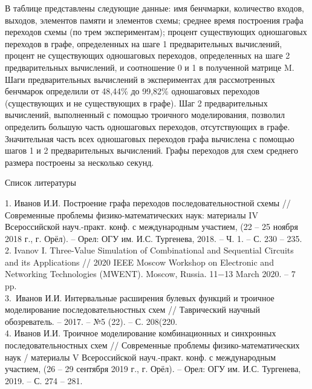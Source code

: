 \documentclass[17pt]{extarticle}
\begin{document}
В таблице представлены следующие данные: имя бенчмарки, количество входов, выходов, элементов памяти и элементов схемы; среднее время построения графа переходов схемы (по трем экспериментам); процент существующих одношаговых переходов в графе, определенных на шаге 1 предварительных вычислений, процент не существующих одношаговых переходов, определенных на шаге 2 предварительных вычислений, и соотношение 0 и 1 в полученной матрице M. \\
\indent Шаги предварительных вычислений в экспериментах для рассмотренных бенчмарок определили от 48,44\% до 99,82\% одношаговых переходов (существующих и не существующих в графе). Шаг 2 предварительных вычислений, выполненный с помощью троичного моделирования, позволил определить большую часть одношаговых переходов, отсутствующих в графе. Значительная часть всех одношаговых переходов графа вычислена с помощью шагов 1 и 2 предварительных вычислений. Графы переходов для схем среднего размера построены за несколько секунд.

\newpage
\begin{center}
    Список литературы  
\end{center}

1. Иванов И.И. Построение графа переходов последовательностной схемы // Современные проблемы физико-математических наук: материалы IV Всероссийской науч.-практ. конф. с международным участием, (22 – 25 ноября 2018 г., г. Орёл). – Орел: ОГУ им. И.С. Тургенева, 2018. – Ч. 1. – С. 230 – 235. \\
2. Ivanov I. Three-Value Simulation of Combinational and Sequential Circuits and its Applications // 2020 IEEE Moscow Workshop on Electronic and Networking Technologies (MWENT). Moscow, Russia. 11−13 March 2020. – 7 pp. \\
3. Иванов И.И. Интервальные расширения булевых функций и троичное моделирование последовательностных схем // Таврический научный обозреватель. – 2017. – №5 (22). – С. 208(220. \\
4. Иванов И.И. Троичное моделирование комбинационных и синхронных последовательностных схем // Современные проблемы физико-математических наук / материалы V Всероссийской науч.-практ. конф. с международным участием, (26 – 29 сентября 2019 г., г. Орёл). – Орел: ОГУ им. И.С. Тургенева, 2019. – С. 274 – 281.
\end{document}
